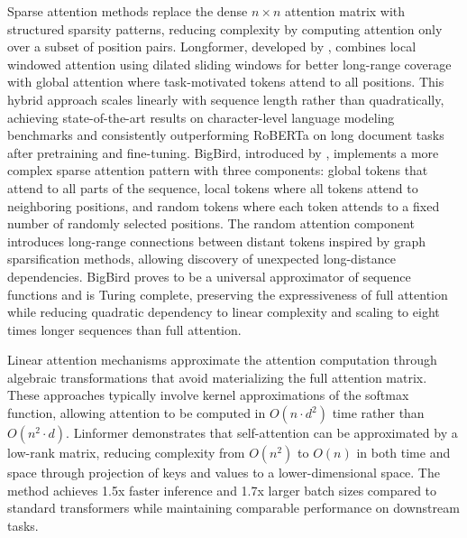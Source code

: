 \documentclass[11pt,letterpaper]{article}
\begin{document}
Sparse attention methods replace the dense $n \times n$ attention matrix with structured sparsity patterns, reducing complexity by computing attention only over a subset of position pairs. Longformer, developed by \cite{beltagy2020longformer}, combines local windowed attention using dilated sliding windows for better long-range coverage with global attention where task-motivated tokens attend to all positions. This hybrid approach scales linearly with sequence length rather than quadratically, achieving state-of-the-art results on character-level language modeling benchmarks and consistently outperforming RoBERTa on long document tasks after pretraining and fine-tuning. BigBird, introduced by \cite{zaheer2020bigbird}, implements a more complex sparse attention pattern with three components: global tokens that attend to all parts of the sequence, local tokens where all tokens attend to neighboring positions, and random tokens where each token attends to a fixed number of randomly selected positions. The random attention component introduces long-range connections between distant tokens inspired by graph sparsification methods, allowing discovery of unexpected long-distance dependencies. BigBird proves to be a universal approximator of sequence functions and is Turing complete, preserving the expressiveness of full attention while reducing quadratic dependency to linear complexity and scaling to eight times longer sequences than full attention.

Linear attention mechanisms approximate the attention computation through algebraic transformations that avoid materializing the full attention matrix. These approaches typically involve kernel approximations of the softmax function, allowing attention to be computed in $O(n \cdot d^2)$ time rather than $O(n^2 \cdot d)$. Linformer demonstrates that self-attention can be approximated by a low-rank matrix, reducing complexity from $O(n^2)$ to $O(n)$ in both time and space through projection of keys and values to a lower-dimensional space. The method achieves 1.5x faster inference and 1.7x larger batch sizes compared to standard transformers while maintaining comparable performance on downstream tasks.
\end{document}
